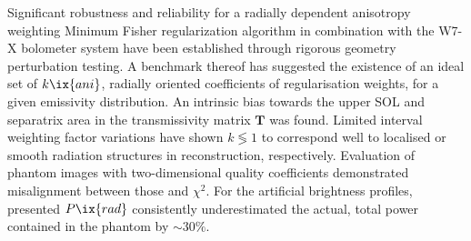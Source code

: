         Significant robustness and reliability for a radially dependent anisotropy weighting Minimum Fisher regularization algorithm in combination with the W7-X bolometer system have been established through rigorous geometry perturbation testing. A benchmark thereof has suggested the existence of an ideal set of $k\ix{ani}$, radially oriented coefficients of regularisation weights, for a given emissivity distribution. An intrinsic bias towards the upper SOL and separatrix area in the transmissivity matrix $\mathbf{T}$ was found. Limited interval weighting factor variations have shown $k\lessgtr1$ to correspond well to localised or smooth radiation structures in reconstruction, respectively. Evaluation of phantom images with two-dimensional quality coefficients demonstrated misalignment between those and $\chi^{2}$. For the artificial brightness profiles, presented $P\ix{rad}$ consistently underestimated the actual, total power contained in the phantom by $\sim30\%$.%
%